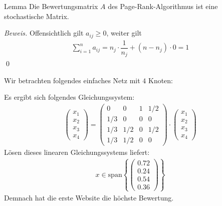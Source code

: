 \begin{colbox}{Lemma}
  Die Bewertungsmatrix $A$ des Page-Rank-Algorithmus ist eine stochastische Matrix.
\end{colbox}
\textit{Beweis.} Offensichtlich gilt $a_{ij}\geq 0$, weiter gilt
\begin{align*}\sum_{i=1}^n a_{ij} = n_j\cdot \dfrac{1}{n_j} + (n-n_j)\cdot 0 = 1\end{align*}
\qed
\begin{egbox}
  Wir betrachten folgendes einfaches Netz mit $4$ Knoten: 

  \begin{center}
    
  \end{center}

  Es ergibt sich folgendes Gleichungssystem:
  \begin{align*}
    \begin{pmatrix}
      x_1\\ x_2\\ x_3\\ x_4
    \end{pmatrix} 
    = \begin{pmatrix}
      0 & 0 & 1 & 1/2 \\ 
      1/3 & 0 & 0 & 0 \\
      1/3 & 1/2 & 0 & 1/2 \\
      1/3 & 1/2 & 0 & 0
    \end{pmatrix}\cdot 
    \begin{pmatrix}
      x_1\\ x_2\\ x_3\\ x_4
    \end{pmatrix}
  \end{align*}
  Lösen dieses linearen Gleichungssystems liefert:
  \begin{align*}
    x \in \text{span}\left\{\begin{pmatrix}
    0.72 \\ 0.24 \\ 0.54 \\ 0.36
    \end{pmatrix}\right\}
  \end{align*}
  Demnach hat die erste Website die höchste Bewertung. 
\end{egbox}

